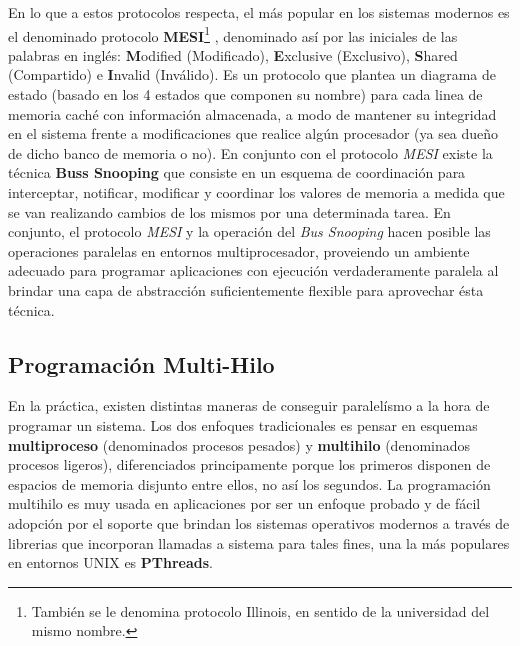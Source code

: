 En lo que a estos protocolos respecta, el más popular en los sistemas modernos es el denominado protocolo \textbf{MESI}\footnote{También se le denomina protocolo Illinois, en sentido de la universidad del mismo nombre.} \cite{paper:MESI}, denominado así por las iniciales de las palabras en inglés: \textbf{M}odified (Modificado), \textbf{E}xclusive (Exclusivo), \textbf{S}hared (Compartido) e \textbf{I}nvalid (Inválido). Es un protocolo que plantea un diagrama de estado (basado en los 4 estados que componen su nombre) para cada linea de memoria caché con información almacenada, a modo de mantener su integridad en el sistema frente a modificaciones que realice algún procesador (ya sea dueño de dicho banco de memoria o no). En conjunto con el protocolo \emph{MESI} existe la técnica \textbf{Buss Snooping} \cite{paper:snoop} que consiste en un esquema de coordinación para interceptar, notificar, modificar y coordinar los valores de memoria a medida que se van realizando cambios de los mismos por una determinada tarea. En conjunto, el protocolo \emph{MESI} y la operación del \emph{Bus Snooping} hacen posible las operaciones paralelas en entornos multiprocesador, proveiendo un ambiente adecuado para programar aplicaciones con ejecución verdaderamente paralela al brindar una capa de abstracción suficientemente flexible para aprovechar ésta técnica.

\subsection{Programación Multi-Hilo}
En la práctica, existen distintas maneras de conseguir paralelísmo a la hora de programar un sistema. Los dos enfoques tradicionales es pensar en esquemas \textbf{multiproceso} (denominados procesos pesados) y \textbf{multihilo} (denominados procesos ligeros), diferenciados principamente porque los primeros disponen de espacios de memoria disjunto entre ellos, no así los segundos. La programación multihilo es muy usada en aplicaciones por ser un enfoque probado y de fácil adopción por el soporte que brindan los sistemas operativos modernos a través de librerias que incorporan llamadas a sistema para tales fines, una la más populares en entornos UNIX es \textbf{PThreads}.

